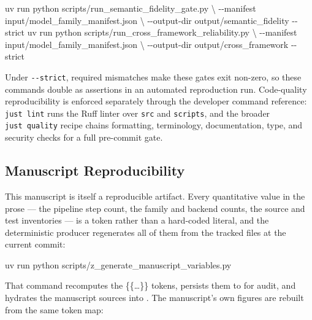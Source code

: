 \documentclass[
  english,
  9pt,
]{extarticle}
\newenvironment{Shaded}{}{}
\newcommand{\AttributeTok}[1]{\textcolor[rgb]{0.49,0.56,0.16}{#1}}
\newcommand{\DataTypeTok}[1]{\textcolor[rgb]{0.56,0.13,0.00}{#1}}
\newcommand{\ExtensionTok}[1]{#1}
\newcommand{\NormalTok}[1]{#1}
\begin{document}
\begin{Shaded}
\begin{Highlighting}[]
\ExtensionTok{uv}\NormalTok{ run python scripts/run\_semantic\_fidelity\_gate.py }\DataTypeTok{\textbackslash{}}
  \AttributeTok{{-}{-}manifest}\NormalTok{ input/model\_family\_manifest.json }\DataTypeTok{\textbackslash{}}
  \AttributeTok{{-}{-}output{-}dir}\NormalTok{ output/semantic\_fidelity }\AttributeTok{{-}{-}strict}
\ExtensionTok{uv}\NormalTok{ run python scripts/run\_cross\_framework\_reliability.py }\DataTypeTok{\textbackslash{}}
  \AttributeTok{{-}{-}manifest}\NormalTok{ input/model\_family\_manifest.json }\DataTypeTok{\textbackslash{}}
  \AttributeTok{{-}{-}output{-}dir}\NormalTok{ output/cross\_framework }\AttributeTok{{-}{-}strict}
\end{Highlighting}
\end{Shaded}

Under \texttt{-\/-strict}, required mismatches make these gates exit
non-zero, so these commands double as assertions in an automated
reproduction run. Code-quality reproducibility is enforced separately
through the developer command reference: \texttt{just\ lint} runs the
Ruff linter over \texttt{src} and \texttt{scripts}, and the broader
\texttt{just\ quality} recipe chains formatting, terminology,
documentation, type, and security checks for a full pre-commit gate.

\subsection{Manuscript
Reproducibility}\label{manuscript-reproducibility}

This manuscript is itself a reproducible artifact. Every quantitative
value in the prose --- the pipeline step count, the family and backend
counts, the source and test inventories --- is a token rather than a
hard-coded literal, and the deterministic producer regenerates all of
them from the tracked files at the current commit:

\begin{Shaded}
\begin{Highlighting}[]
\ExtensionTok{uv}\NormalTok{ run python scripts/z\_generate\_manuscript\_variables.py}
\end{Highlighting}
\end{Shaded}

That command recomputes the \{\{\ldots\}\} tokens, persists them to
 for audit, and hydrates
the manuscript sources into . The
manuscript's own figures are rebuilt from the same token map:
\end{document}
